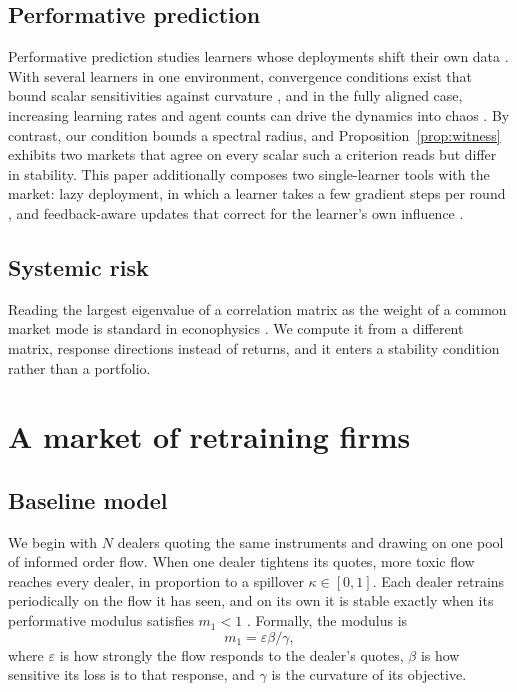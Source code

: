 \documentclass[conference]{IEEEtran}
\theoremstyle{plain}
\begin{document}
\subsection{Performative prediction}
Performative prediction studies learners whose deployments shift their own data \cite{perdomo2020}. With several learners in one environment, convergence conditions exist that bound scalar sensitivities against curvature \cite{narang2023}, and in the fully aligned case, increasing learning rates and agent counts can drive the dynamics into chaos \cite{piliouras2023}. By contrast, our condition bounds a spectral radius, and Proposition~\ref{prop:witness} exhibits two markets that agree on every scalar such a criterion reads but differ in stability. This paper additionally composes two single-learner tools with the market: lazy deployment, in which a learner takes a few gradient steps per round \cite{mendlerdunner2020}, and feedback-aware updates that correct for the learner's own influence \cite{izzo2021,miller2021}.

\subsection{Systemic risk}
Reading the largest eigenvalue of a correlation matrix as the weight of a common market mode is standard in econophysics \cite{laloux1999,plerou2002}. We compute it from a different matrix, response directions instead of returns, and it enters a stability condition rather than a portfolio.

\section{A market of retraining firms}
\label{sec:setup}

\subsection{Baseline model}
We begin with $N$ dealers quoting the same instruments and drawing on one pool of informed order flow. When one dealer tightens its quotes, more toxic flow reaches every dealer, in proportion to a spillover $\kappa\in[0,1]$. Each dealer retrains periodically on the flow it has seen, and on its own it is stable exactly when its performative modulus satisfies $m_1<1$ \cite{perdomo2020}. Formally, the modulus is
\begin{equation*}
m_1=\varepsilon\beta/\gamma,
\end{equation*}
where $\varepsilon$ is how strongly the flow responds to the dealer's quotes, $\beta$ is how sensitive its loss is to that response, and $\gamma$ is the curvature of its objective.
\end{document}
